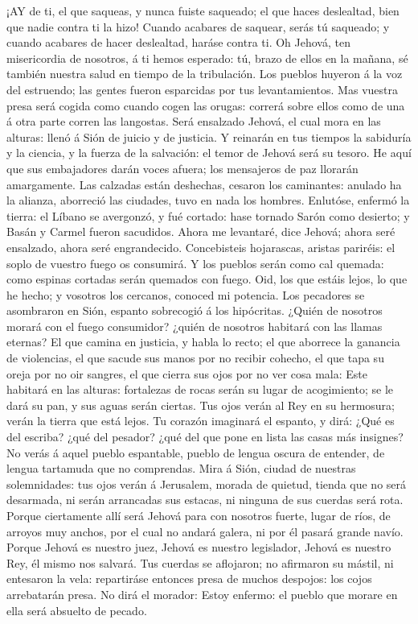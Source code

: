  ¡AY de ti, el que saqueas, y nunca fuiste saqueado; el que
haces deslealtad, bien que nadie contra ti la hizo! Cuando acabares de
saquear, serás tú saqueado; y cuando acabares de hacer deslealtad,
haráse contra ti.  Oh Jehová, ten misericordia de nosotros,
á ti hemos esperado: tú, brazo de ellos en la mañana, sé también nuestra
salud en tiempo de la tribulación.  Los pueblos huyeron á la
voz del estruendo; las gentes fueron esparcidas por tus levantamientos.
 Mas vuestra presa será cogida como cuando cogen las orugas:
correrá sobre ellos como de una á otra parte corren las langostas.
 Será ensalzado Jehová, el cual mora en las alturas: llenó á
Sión de juicio y de justicia.  Y reinarán en tus tiempos la
sabiduría y la ciencia, y la fuerza de la salvación: el temor de Jehová
será su tesoro.  He aquí que sus embajadores darán voces
afuera; los mensajeros de paz llorarán amargamente.  Las
calzadas están deshechas, cesaron los caminantes: anulado ha la alianza,
aborreció las ciudades, tuvo en nada los hombres.  Enlutóse,
enfermó la tierra: el Líbano se avergonzó, y fué cortado: hase tornado
Sarón como desierto; y Basán y Carmel fueron sacudidos. 
Ahora me levantaré, dice Jehová; ahora seré ensalzado, ahora seré
engrandecido.  Concebisteis hojarascas, aristas pariréis:
el soplo de vuestro fuego os consumirá.  Y los pueblos
serán como cal quemada: como espinas cortadas serán quemados con fuego.
 Oid, los que estáis lejos, lo que he hecho; y vosotros los
cercanos, conoced mi potencia.  Los pecadores se asombraron
en Sión, espanto sobrecogió á los hipócritas. ¿Quién de nosotros morará
con el fuego consumidor? ¿quién de nosotros habitará con las llamas
eternas?  El que camina en justicia, y habla lo recto; el
que aborrece la ganancia de violencias, el que sacude sus manos por no
recibir cohecho, el que tapa su oreja por no oir sangres, el que cierra
sus ojos por no ver cosa mala:  Este habitará en las
alturas: fortalezas de rocas serán su lugar de acogimiento; se le dará
su pan, y sus aguas serán ciertas.  Tus ojos verán al Rey
en su hermosura; verán la tierra que está lejos.  Tu
corazón imaginará el espanto, y dirá: ¿Qué es del escriba? ¿qué del
pesador? ¿qué del que pone en lista las casas más insignes?
 No verás á aquel pueblo espantable, pueblo de lengua
oscura de entender, de lengua tartamuda que no comprendas. 
Mira á Sión, ciudad de nuestras solemnidades: tus ojos verán á
Jerusalem, morada de quietud, tienda que no será desarmada, ni serán
arrancadas sus estacas, ni ninguna de sus cuerdas será rota.
 Porque ciertamente allí será Jehová para con nosotros
fuerte, lugar de ríos, de arroyos muy anchos, por el cual no andará
galera, ni por él pasará grande navío.  Porque Jehová es
nuestro juez, Jehová es nuestro legislador, Jehová es nuestro Rey, él
mismo nos salvará.  Tus cuerdas se aflojaron; no afirmaron
su mástil, ni entesaron la vela: repartiráse entonces presa de muchos
despojos: los cojos arrebatarán presa.  No dirá el morador:
Estoy enfermo: el pueblo que morare en ella será absuelto de pecado.

